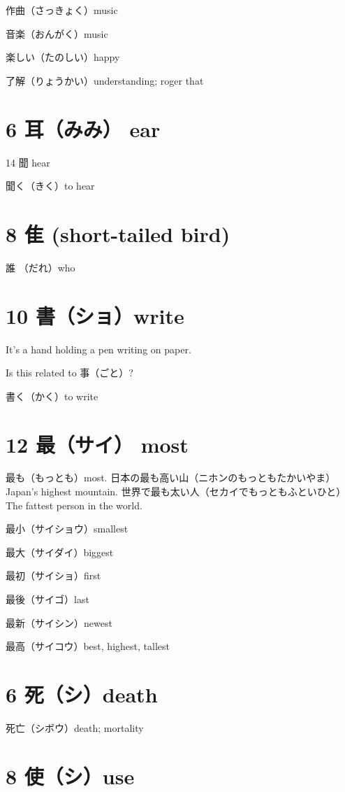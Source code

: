 作曲（さっきょく）music

音楽（おんがく）music

楽しい（たのしい）happy

了解（りょうかい）understanding; roger that

\section{6 耳（みみ） ear}

14 聞 hear

聞く（きく）to hear

\section{8 隹 (short-tailed bird)}

誰 （だれ）who

\section{10 書（ショ）write}

It's a hand holding a pen writing on paper.

Is this related to 事（ごと）?

書く（かく）to write

\section{12 最（サイ） most}

最も（もっとも）most.
日本の最も高い山（ニホンのもっともたかいやま）Japan's highest mountain.
世界で最も太い人（セカイでもっともふといひと）The fattest person in the world.

最小（サイショウ）smallest

最大（サイダイ）biggest

最初（サイショ）first

最後（サイゴ）last

最新（サイシン）newest

最高（サイコウ）best, highest, tallest

\section{6 死（シ）death}

死亡（シボウ）death; mortality

\section{8 使（シ）use}

